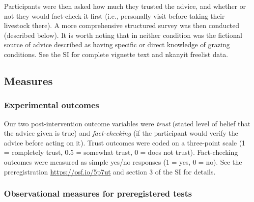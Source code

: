 \documentclass[
  11pt,
]{article}
\begin{document}
Participants were then asked how much they trusted the advice, and
whether or not they would fact-check it first (i.e., personally visit
before taking their livestock there). A more comprehensive structured
survey was then conducted (described below). It is worth noting that in
neither condition was the fictional source of advice described as having
specific or direct knowledge of grazing conditions. See the SI for
complete vignette text and nkanyit freelist data.

\hypertarget{measures}{%
\subsection{Measures}\label{measures}}

\hypertarget{experimental-outcomes}{%
\subsubsection{Experimental outcomes}\label{experimental-outcomes}}

Our two post-intervention outcome variables were \emph{trust} (stated
level of belief that the advice given is true) and \emph{fact-checking}
(if the participant would verify the advice before acting on it). Trust
outcomes were coded on a three-point scale (1 = completely trust, 0.5 =
somewhat trust, 0 = does not trust). Fact-checking outcomes were
measured as simple yes/no responses (1 = yes, 0 = no). See the
preregistration \url{https://osf.io/5p7ut} and section 3 of the SI for
details.

\hypertarget{observational-measures-for-preregistered-tests}{%
\subsubsection{Observational measures for preregistered
tests}\label{observational-measures-for-preregistered-tests}}
\end{document}
